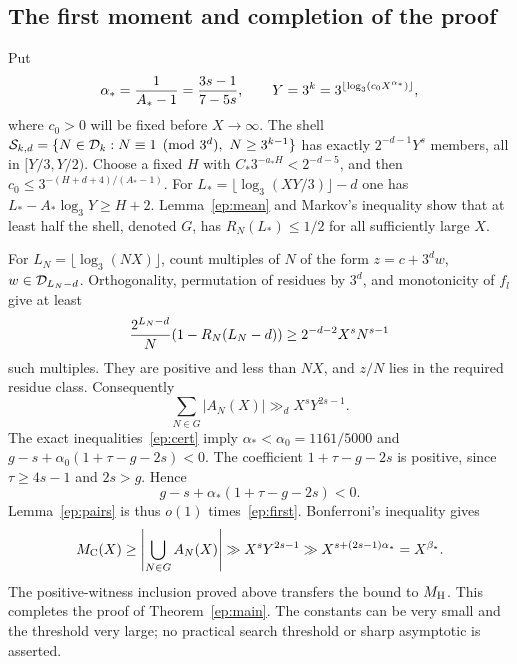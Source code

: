 \subsection{The first moment and completion of the proof}
Put
\[
 \alpha_*={1\over A_*-1}={3s-1\over7-5s},\qquad
 Y=3^k=3^{\lfloor\log_3(c_0X^{\alpha_*})\rfloor},
\]
where $c_0>0$ will be fixed before $X\to\infty$.
The shell
$\mathcal S_{k,d}=\{N\in\mathcal D_k:N\equiv1\pmod{3^d},\ N\ge3^{k-1}\}$
has exactly $2^{-d-1}Y^s$ members, all in $[Y/3,Y/2)$.
Choose a fixed $H$ with $C_*3^{-a_*H}<2^{-d-5}$, and then
$c_0\le3^{-(H+d+4)/(A_*-1)}$. For
$L_* =\lfloor\log_3(XY/3)\rfloor-d$ one has
$L_*-A_*\log_3Y\ge H+2$.
Lemma~\ref{ep:mean} and Markov's inequality show that at least half
the shell, denoted $G$, has $R_N(L_*)\le1/2$ for all sufficiently large $X$.

For $L_N=\lfloor\log_3(NX)\rfloor$, count multiples of $N$ of the form
$z=c+3^dw$, $w\in\mathcal D_{L_N-d}$. Orthogonality, permutation of residues
by $3^d$, and monotonicity of $f_l$ give at least
\[
 {2^{L_N-d}\over N}(1-R_N(L_N-d))
 \ge2^{-d-2}X^sN^{s-1}
\]
such multiples. They are positive and less than $NX$, and $z/N$ lies
in the required residue class. Consequently
\begin{equation}\label{ep:first}
 \sum_{N\in G}|A_N(X)|\gg_d X^sY^{2s-1}.
\end{equation}
The exact inequalities~\eqref{ep:cert} imply
$\alpha_*<\alpha_0=1161/5000$ and
$g-s+\alpha_0(1+\tau-g-2s)<0$.
The coefficient $1+\tau-g-2s$ is positive, since
$\tau\ge4s-1$ and $2s>g$. Hence
\[
 g-s+\alpha_*(1+\tau-g-2s)<0.
\]
Lemma~\ref{ep:pairs} is thus $o(1)$ times~\eqref{ep:first}.
Bonferroni's inequality gives
\[
 M_{\mathrm C}(X)\ge\left|\bigcup_{N\in G}A_N(X)\right|
 \gg X^sY^{2s-1}\gg X^{s+(2s-1)\alpha_*}=X^{\beta_*}.
\]
The positive-witness inclusion proved above transfers the bound to
$M_{\mathrm H}$. This completes the proof of Theorem~\ref{ep:main}.
The constants can be very small and the threshold very large; no
practical search threshold or sharp asymptotic is asserted.
